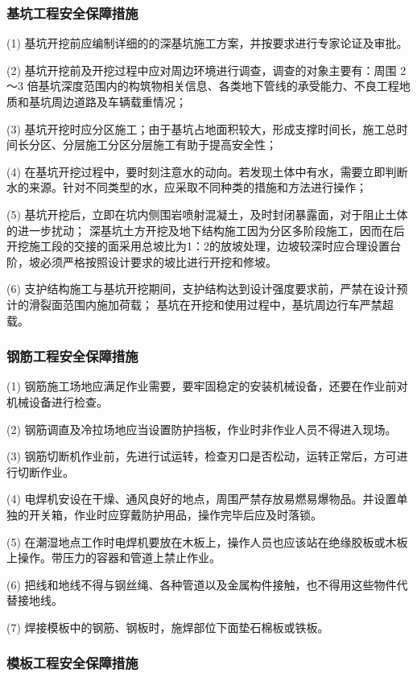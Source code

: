 \subsubsection{基坑工程安全保障措施}

(1) 基坑开挖前应编制详细的的深基坑施工方案，并按要求进行专家论证及审批。

(2) 基坑开挖前及开挖过程中应对周边环境进行调查，调查的对象主要有：周围 2～3 倍基坑深度范围内的构筑物相关信息、各类地下管线的承受能力、不良工程地质和基坑周边道路及车辆载重情况；

(3) 基坑开挖时应分区施工；由于基坑占地面积较大，形成支撑时间长，施工总时间长分区、分层施工分区分层施工有助于提高安全性；

(4) 在基坑开挖过程中，要时刻注意水的动向。若发现土体中有水，需要立即判断水的来源。针对不同类型的水，应采取不同种类的措施和方法进行操作；

(5) 基坑开挖后，立即在坑内侧围岩喷射混凝土，及时封闭暴露面，对于阻止土体的进一步扰动；
深基坑土方开挖及地下结构施工因为分区多阶段施工，因而在后开挖施工段的交接的面采用总坡比为1：2的放坡处理，边坡较深时应合理设置台阶，坡必须严格按照设计要求的坡比进行开挖和修坡。

(6) 支护结构施工与基坑开挖期间，支护结构达到设计强度要求前，严禁在设计预计的滑裂面范围内施加荷载；
基坑在开挖和使用过程中，基坑周边行车严禁超载。

\subsubsection{钢筋工程安全保障措施}

(1) 钢筋施工场地应满足作业需要，要牢固稳定的安装机械设备，还要在作业前对机械设备进行检查。

(2) 钢筋调直及冷拉场地应当设置防护挡板，作业时非作业人员不得进入现场。

(3) 钢筋切断机作业前，先进行试运转，检查刃口是否松动，运转正常后，方可进行切断作业。

(4) 电焊机安设在干燥、通风良好的地点，周围严禁存放易燃易爆物品。并设置单独的开关箱，作业时应穿戴防护用品，操作完毕后应及时落锁。

(5) 在潮湿地点工作时电焊机要放在木板上，操作人员也应该站在绝缘胶板或木板上操作。带压力的容器和管道上禁止作业。

(6) 把线和地线不得与钢丝绳、各种管道以及金属构件接触，也不得用这些物件代替接地线。

(7) 焊接模板中的钢筋、钢板时，施焊部位下面垫石棉板或铁板。

\subsubsection{模板工程安全保障措施}

